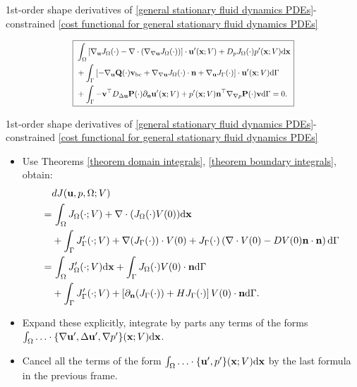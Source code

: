 \documentclass[10pt
hyperref={
    pdfauthor={Hong Quan Ba Nguyen},
    pdftitle={Optimal Shape Design of Air Ducts in Combustion Engines: Design a General Framework},
    pdfsubject={Talk},
    pdfcreator={LaTeX},
}
]{beamer}
\begin{document}
\begin{frame}{1st-order shape derivatives of \eqref{general stationary fluid dynamics PDEs}-constrained \eqref{cost functional for general stationary fluid dynamics PDEs}}
\begin{itemize}
        \begin{equation*}
            \scalebox{0.8}{%
            \boxed{\left.\begin{split}
                &\int_\Omega \left[\nabla_{\textbf{u}}J_\Omega(\cdot) - \nabla\cdot\left(\nabla_{\nabla{\textbf{u}}}J_\Omega(\cdot)\right)\right]\cdot\textbf{u}'(\textbf{x};V) + D_pJ_\Omega(\cdot)p'(\textbf{x};V){\rm d}\textbf{x}\\
                &+ \int_\Gamma \left[-\nabla_{\textbf{u}}\textbf{Q}(\cdot)\textbf{v}_{\rm bc} + \nabla_{\nabla{\textbf{u}}}J_\Omega(\cdot)\cdot\textbf{n} + \nabla_{\textbf{u}}J_\Gamma(\cdot)\right]\cdot\textbf{u}'(\textbf{x};V){\rm d}\Gamma\\
                &+ \int_\Gamma -\textbf{v}^\top D_{\Delta\textbf{u}}\textbf{P}(\cdot)\partial_{\textbf{n}}\textbf{u}'(\textbf{x};V) + p'(\textbf{x};V)\textbf{n}^\top\nabla_{\nabla p}\textbf{P}(\cdot)\textbf{v}{\rm d}\Gamma = 0.
            \end{split}\right.}}
        \end{equation*}
    \end{itemize}
\end{frame}

\begin{frame}{1st-order shape derivatives of \eqref{general stationary fluid dynamics PDEs}-constrained \eqref{cost functional for general stationary fluid dynamics PDEs}}
    \begin{itemize}
        \item Use Theorems \ref{theorem domain integrals}, \ref{theorem boundary integrals}, obtain:
        \begin{align*}
            &dJ(\textbf{u},p,\Omega;V)\\
            =&\, \int_\Omega J_\Omega(\cdot;V) + \nabla\cdot(J_\Omega(\cdot)V(0)){\rm d}\textbf{x}\\
            &+ \int_\Gamma J_\Gamma'(\cdot;V) + \nabla(J_\Gamma(\cdot))\cdot V(0) + J_\Gamma(\cdot)\left(\nabla\cdot V(0) - DV(0)\textbf{n}\cdot\textbf{n}\right){\rm d}\Gamma\\
            =&\,  \int_\Omega J_\Omega'(\cdot;V){\rm d}\textbf{x} + \int_\Gamma J_\Omega(\cdot)V(0)\cdot\textbf{n}{\rm d}\Gamma\\
            &+ \int_\Gamma J_\Gamma'(\cdot;V) + \left[\partial_{\textbf{n}}(J_\Gamma(\cdot)) + HJ_\Gamma(\cdot)\right]V(0)\cdot\textbf{n}{\rm d}\Gamma.
        \end{align*}
        \item Expand these explicitly, integrate by parts any terms of the forms $\int_\Omega \ldots\cdot\{\nabla\textbf{u}',\Delta\textbf{u}',\nabla p'\}(\textbf{x};V){\rm d}\textbf{x}$.
        \item Cancel all the terms of the form $\int_\Omega \ldots\cdot\{\textbf{u}',p'\}(\textbf{x};V){\rm d}\textbf{x}$ by the last formula in the previous frame.
    \end{itemize}
\end{frame}
   
\end{document}
